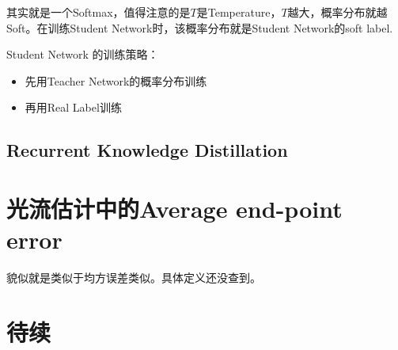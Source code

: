 其实就是一个Softmax，值得注意的是$T$是Temperature，$T$越大，概率分布就越Soft。在训练Student Network时，该概率分布就是Student Network的soft label.

Student Network 的训练策略：
\begin{itemize}
\item 先用Teacher Network的概率分布训练
\item 再用Real Label训练
\end{itemize}

\subsection{Recurrent Knowledge Distillation \cite{Silvia2018Recurrent}}

\section{光流估计中的Average end-point error}

貌似就是类似于均方误差类似。具体定义还没查到。



\section{待续}













